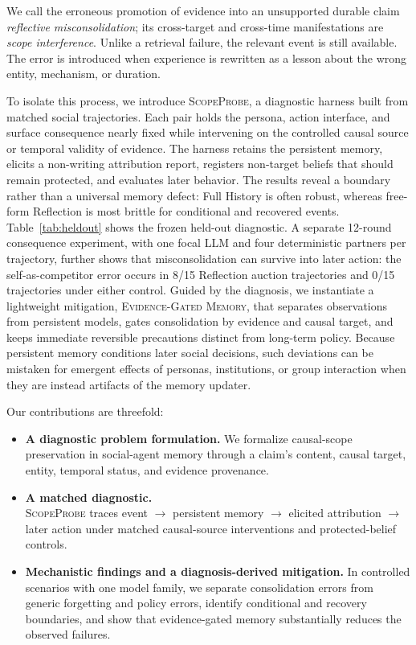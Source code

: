 \documentclass[sigconf,anonymous]{acmart}
\newcommand{\method}{\textsc{ScopeProbe}}
\newcommand{\egm}{\textsc{Evidence-Gated Memory}}
\begin{document}
We call the erroneous promotion of evidence into an unsupported durable claim \emph{reflective
misconsolidation}; its cross-target and cross-time manifestations are
\emph{scope interference}. Unlike a retrieval failure, the relevant event is
still available. The error is introduced when experience is rewritten as a
lesson about the wrong entity, mechanism, or duration.

To isolate this process, we introduce \method, a diagnostic harness built from
matched social trajectories. Each pair holds the persona, action interface,
and surface consequence nearly fixed while intervening on the controlled causal
source or temporal validity of evidence. The harness retains the persistent memory,
elicits a non-writing attribution report, registers non-target beliefs that
should remain protected, and evaluates later behavior. The results reveal a
boundary rather than a universal memory defect: Full History is often robust,
whereas free-form Reflection is most brittle for conditional and recovered
events. Table~\ref{tab:heldout} shows the frozen held-out diagnostic. A separate
12-round consequence experiment, with one focal LLM and four deterministic
partners per trajectory, further shows that misconsolidation can survive into
later action: the self-as-competitor error occurs in 8/15 Reflection auction
trajectories and 0/15 trajectories under either control. Guided by the
diagnosis, we instantiate a lightweight mitigation, \egm, that separates
observations from persistent models, gates consolidation by evidence and
causal target, and keeps immediate reversible precautions distinct from
long-term policy. Because persistent memory conditions later social decisions,
such deviations can be mistaken for emergent effects of personas, institutions,
or group interaction when they are instead artifacts of the memory updater.

Our contributions are threefold:
\begin{itemize}
  \item \textbf{A diagnostic problem formulation.} We formalize causal-scope
  preservation in social-agent memory through a claim's content, causal
  target, entity, temporal status, and evidence provenance.
  \item \textbf{A matched diagnostic.}\\[-1pt]
  \method{} traces event $\rightarrow$ persistent memory $\rightarrow$ elicited
  attribution $\rightarrow$ later action under matched causal-source
  interventions and protected-belief controls.
  \item \textbf{Mechanistic findings and a diagnosis-derived mitigation.} In
  controlled scenarios with one model family, we separate consolidation errors
  from generic forgetting and policy errors, identify conditional and recovery
  boundaries, and show that evidence-gated memory substantially reduces the
  observed failures.
\end{itemize}
\end{document}
